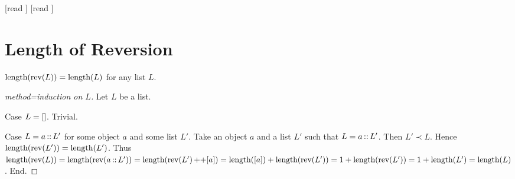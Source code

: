 \documentclass[10pt]{article}
\begin{document}
  \begin{imports}
    \begin{forthel}
      [read ]
      [read ]
    \end{forthel}
  \end{imports}


  \section*{Length of Reversion}

  \begin{forthel}
    \begin{proposition}[id=LISTS_LENGTHREV_4512036658964875,printid]
      $\textrm{length}(\textrm{rev}(L)) = \textrm{length}(L)$ for any list $L$.
    \end{proposition}
    \begin{proof}[method=induction on $L$]
      Let $L$ be a list.
      
      Case $L = []$. Trivial.
      
      Case $L = a \mathop{::} L'$ for some object $a$ and some list $L'$.
        Take an object $a$ and a list $L'$ such that $L = a \mathop{::} L'$.
        Then $L' \prec L$.
        Hence $\textrm{length}(\textrm{rev}(L')) = \textrm{length}(L')$.
        Thus $\textrm{length}(\textrm{rev}(L))
          = \textrm{length}(\textrm{rev}(a \mathop{::} L'))
          = \textrm{length}(\textrm{rev}(L') \mathop{++} [a])
          = \textrm{length}([a]) + \textrm{length}(\textrm{rev}(L'))
          = 1 + \textrm{length}(\textrm{rev}(L'))
          = 1 + \textrm{length}(L')
          = \textrm{length}(L)$.
      End.
    \end{proof}
  \end{forthel}
\end{document}
